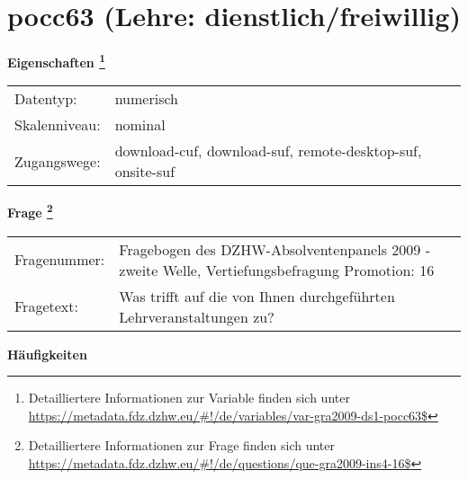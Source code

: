 
    \setcounter{footnote}{0}

    \vspace*{-1.8cm}
	\section{pocc63 (Lehre: dienstlich/freiwillig)}
	\label{section:pocc63}



    \vspace*{0.5cm}
    \noindent\textbf{Eigenschaften
	\footnote{Detailliertere Informationen zur Variable finden sich unter
		\url{https://metadata.fdz.dzhw.eu/\#!/de/variables/var-gra2009-ds1-pocc63$}}}\\
	\begin{tabularx}{\hsize}{@{}lX}
	Datentyp: & numerisch \\
	Skalenniveau: & nominal \\
	Zugangswege: &
	  download-cuf, 
	  download-suf, 
	  remote-desktop-suf, 
	  onsite-suf
 \\
    \end{tabularx}



				\vspace*{0.5cm}
                \noindent\textbf{Frage
	                \footnote{Detailliertere Informationen zur Frage finden sich unter
		              \url{https://metadata.fdz.dzhw.eu/\#!/de/questions/que-gra2009-ins4-16$}}}\\
				\begin{tabularx}{\hsize}{@{}lX}
					Fragenummer: &
					  Fragebogen des DZHW-Absolventenpanels 2009 - zweite Welle, Vertiefungsbefragung Promotion:
					  16
 \\
					Fragetext: & Was trifft auf die von Ihnen durchgeführten Lehrveranstaltungen zu? \\
				\end{tabularx}





        		\vspace*{0.5cm}
                \noindent\textbf{Häufigkeiten}

